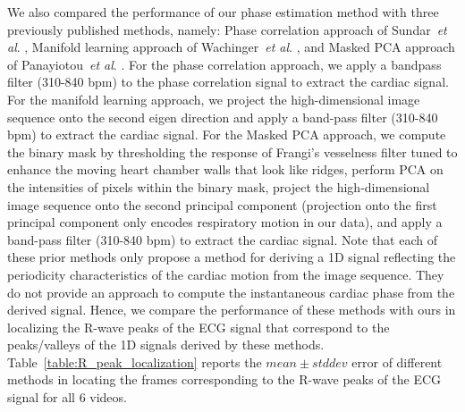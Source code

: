 \documentclass[journal]{IEEEtran}
\newcommand{\etal}{~\textit{et al}. }
\begin{document}
	We also compared the performance of our phase estimation method with three previously published methods, namely: Phase correlation approach of Sundar\etal\cite{Sundar2009}, Manifold learning approach of Wachinger\etal\cite{Wachinger2012}, and Masked PCA approach of Panayiotou\etal\cite{Panayiotou2014}. For the phase correlation approach, we apply a bandpass filter (310-840 bpm) to the phase correlation signal to extract the cardiac signal. For the manifold learning approach, we project the high-dimensional image sequence onto the second eigen direction and apply a band-pass filter (310-840 bpm) to extract the cardiac signal. For the Masked PCA approach, we compute the binary mask by thresholding the response of Frangi's vesselness filter tuned to enhance the moving heart chamber walls that look like ridges, perform PCA on the intensities of pixels within the binary mask,  project the high-dimensional image sequence onto the second principal component (projection onto the first principal component only encodes respiratory motion in our data), and apply a band-pass filter (310-840 bpm) to extract the cardiac signal. Note that each of these prior methods only propose a method for deriving a 1D signal reflecting the periodicity characteristics of the cardiac motion from the image sequence. They do not provide an approach to compute the instantaneous cardiac phase from the derived signal. Hence, we compare the performance of these methods with ours in localizing the R-wave peaks of the ECG signal that correspond to the peaks/valleys of the 1D signals derived by these methods. Table~\ref{table:R_peak_localization} reports the $mean \pm stddev$ error of different methods in locating the frames corresponding to the R-wave peaks of the ECG signal for all 6 videos. 
	
\end{document}
